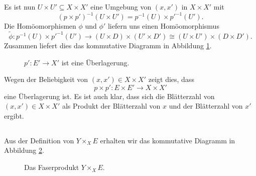 \documentclass[a4paper,10pt]{article}
\begin{document}
Es ist nun $U \times U' \subseteq X \times X'$ eine Umgebung von $(x,x')$ in $X \times X'$ mit
\[
 \left( p \times p' \right)^{-1} (U \times U') = p^{-1}(U) \times p'^{-1}(U').
\]
Die Homöomorphismen $\phi$ und $\phi'$ liefern uns einen Homöomorphismus
\[
 \tilde{\phi} : p^{-1}(U) \times p'^{-1}(U') \to (U \times D) \times (U' \times D') \cong (U \times U') \times (D \times D').
\]
Zusammen liefert dies das kommutative Diagramm in Abbildung \ref{fig: Überlagerung für U x U'}.
\begin{figure}[h]\centering
 \caption{$p' : E' \to X'$ ist eine Überlagerung.}
 \label{fig: Überlagerung für U x U'}
\end{figure}

Wegen der Beliebigkeit von $(x,x') \in X \times X'$ zeigt dies, dass
\[
 p \times p' : E \times E' \to X \times X'
\]
eine Überlagerung ist. Es ist auch klar, dass sich die Blätterzahl von $(x,x') \in X \times X'$ als Produkt der Blätterzahl von $x$ und der Blätterzahl von $x'$ ergibt.


\subsection{}
Aus der Definition von $Y \times_X E$ erhalten wir das kommutative Diagramm in Abbildung \ref{fig: Faserprodukt}.
\begin{figure}[h]\centering
 \caption{Das Faserprodukt $Y \times_X E$.}
 \label{fig: Faserprodukt}
\end{figure}
\end{document}
